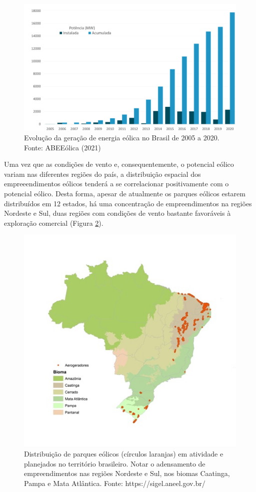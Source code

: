 \documentclass[
  oneside]{scrbook}
\begin{document}
\begin{figure}[H]

{\centering \includegraphics[width=0.8\linewidth]{imagens/cap01/Figura_1.3} 

}

\caption{Evolução da geração de energia eólica no Brasil de 2005 a 2020. Fonte: ABEEólica (2021)}\label{fig:03}
\end{figure}

Uma vez que as condições de vento e, consequentemente, o potencial eólico variam nas diferentes regiões do país, a distribuição espacial dos empreeendimentos eólicos tenderá a se correlacionar positivamente com o potencial eólico. Desta forma, apesar de atualmente os parques eólicos estarem distribuídos em 12 estados, há uma concentração de empreendimentos na regiões Nordeste e Sul, duas regiões com condições de vento bastante favoráveis à exploração comercial (Figura \ref{fig:04}).

\begin{figure}[H]

{\centering \includegraphics[width=0.7\linewidth]{imagens/cap01/Figura_1.4} 

}

\caption{Distribuição de parques eólicos (círculos laranjas) em atividade e planejados no território brasileiro. Notar o adensamento de empreendimentos nas regiões Nordeste e Sul, nos biomas Caatinga, Pampa e Mata Atlântica. Fonte: https://sigel.aneel.gov.br/}\label{fig:04}
\end{figure}
\end{document}
